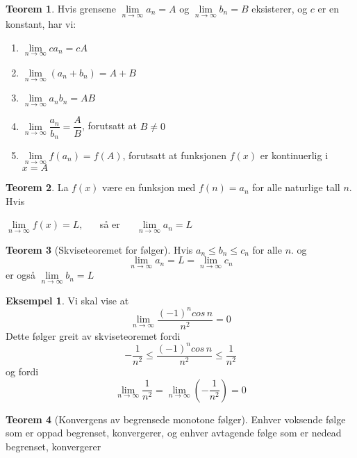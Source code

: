 \documentclass[11pt]{article}
\theoremstyle{definition}
\theoremstyle{definition}
\newtheorem{mitteks}{Eksempel}[section]
\theoremstyle{definition}
\theoremstyle{definition}
\newtheorem{teo}{Teorem}[section]
\newenvironment{fteo}
{\begin{mdframed}[style=minstil]\begin{teo}}
		{\end{teo}\end{mdframed}}
\theoremstyle{definition}
\theoremstyle{definition}
\begin{document}
		\begin{fteo}
			Hvis grensene \(\lim\limits_{n\rightarrow \infty}a_n=A\) og \(\lim\limits_{n\rightarrow \infty}b_n=B\)
			eksisterer, og \(c\) er en konstant, har vi:
			\begin{enumerate}
				\item \(\lim\limits_{n\rightarrow \infty}ca_n=cA\)
				\item \(\lim\limits_{n\rightarrow \infty}(a_n+b_n)=A+B\)
				\item \(\lim\limits_{n\rightarrow \infty}a_nb_n=AB\)
				\item \(\lim\limits_{n\rightarrow \infty}\dfrac{a_n}{b_n}=\dfrac{A}{B}\), forutsatt at \(B\neq 0\)
				\item \(\lim\limits_{n\rightarrow \infty}f(a_n)=f(A)\), forutsatt at funksjonen \(f(x)\) er kontinuerlig i \(x=A\) 
			\end{enumerate}  
		\end{fteo} 
		
		\begin{fteo}
			La \(f(x)\) være en funksjon med \(f(n)=a_n\) for alle naturlige tall \(n\). Hvis 
			
			\( \lim\limits_{n\rightarrow \infty } f(x) = L, \hspace{16pt} \)  så er   \(\hspace{16pt} \lim\limits_{n\rightarrow \infty}a_n=L \)
		\end{fteo}
		
		\begin{fteo}[Skviseteoremet for følger] \leavevmode
			
			Hvis \(a_n\leq b_n\leq c_n\) for alle \(n\). og 
			\[\lim\limits_{n\rightarrow \infty}a_n=L=\lim\limits_{n\rightarrow \infty}c_n \]
			er også \(\lim\limits_{n\rightarrow \infty}b_n=L\) 
		\end{fteo}
		
		\begin{mitteks}
			Vi skal vise at \[\lim\limits_{n\rightarrow\infty}\dfrac{(-1)^ncos\, n}{n^2}=0\]
			Dette følger greit av skviseteoremet fordi 
			\[-\dfrac{1}{n^2}\leq \dfrac{(-1)^ncos\, n}{n^2}\leq \dfrac{1}{n^2}\]
			og fordi \[\lim\limits_{n\rightarrow\infty}\dfrac{1}{n^2}=\lim\limits_{n\rightarrow\infty}\left( -\dfrac{1}{n^2}\right) =0\]
		\end{mitteks}
		
		\newpage
		
		\begin{fteo}[Konvergens av begrensede monotone følger]\leavevmode
			
			Enhver voksende følge som er oppad begrenset, konvergerer, og enhver avtagende følge som er nedead begrenset, konvergerer
		\end{fteo}
		
\end{document}
